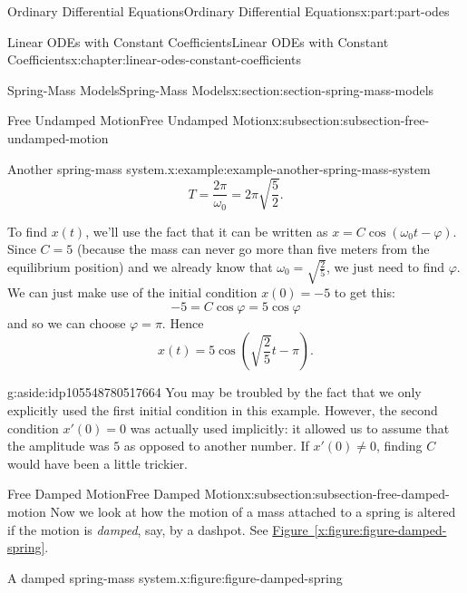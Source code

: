 \documentclass[oneside,10pt,]{book}
\newcommand{\xreffont}{\relax}
\numberwithin{equation}{part}
\begin{document}
\begin{partptx}{Ordinary Differential Equations}{}{Ordinary Differential Equations}{}{}{x:part:part-odes}
\begin{chapterptx}{Linear ODEs with Constant Coefficients}{}{Linear ODEs with Constant Coefficients}{}{}{x:chapter:linear-odes-constant-coefficients}
\begin{sectionptx}{Spring-Mass Models}{}{Spring-Mass Models}{}{}{x:section:section-spring-mass-models}
\begin{subsectionptx}{Free Undamped Motion}{}{Free Undamped Motion}{}{}{x:subsection:subsection-free-undamped-motion}
\begin{example}{Another spring-mass system.}{x:example:example-another-spring-mass-system}
\begin{equation*}
T = \frac{2\pi}{\omega_{0}} = 2\pi\sqrt{\frac{5}{2}}.
\end{equation*}
%
\par
To find \(x(t)\), we'll use the fact that it can be written as \(x = C\cos(\omega_{0}t-\varphi)\). Since \(C = 5\) (because the mass can never go more than five meters from the equilibrium position) and we already know that \(\omega_{0} = \sqrt{\frac{2}{5}}\), we just need to find \(\varphi\). We can just make use of the initial condition \(x(0) = -5\) to get this:%
\begin{equation*}
-5 = C\cos\varphi = 5\cos\varphi
\end{equation*}
and so we can choose \(\varphi=\pi\). Hence%
\begin{equation*}
x(t) = 5\cos(\sqrt{\frac{2}{5}}t-\pi).
\end{equation*}
%
\end{example}
\begin{aside}{}{g:aside:idp105548780517664}%
You may be troubled by the fact that we only explicitly used the first initial condition in this example. However, the second condition \(x'(0) = 0\) was actually used implicitly: it allowed us to assume that the amplitude was \(5\) as opposed to another number. If \(x'(0)\neq0\), finding \(C\) would have been a little trickier.%
\end{aside}
\end{subsectionptx}
%
%
\typeout{************************************************}
\typeout{************************************************}
%
\begin{subsectionptx}{Free Damped Motion}{}{Free Damped Motion}{}{}{x:subsection:subsection-free-damped-motion}
Now we look at how the motion of a mass attached to a spring is altered if the motion is \emph{damped}, say, by a dashpot. See \hyperref[x:figure:figure-damped-spring]{Figure~{\xreffont\ref{x:figure:figure-damped-spring}}}.%
\begin{figureptx}{A damped spring-mass system.}{x:figure:figure-damped-spring}{}%
\begin{image}{0}{1}{0}%
\end{image}
\end{figureptx}
\end{subsectionptx}
\end{sectionptx}
\end{chapterptx}
\end{partptx}
\end{document}
